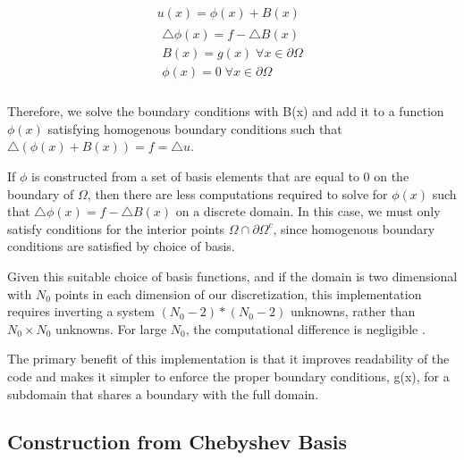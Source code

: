\documentclass[final]{siamart1116}
\numberwithin{theorem}{section}
\begin{document}
\begin{gather}
u(x) = \phi(x) + B(x) \label{boyd} \\
  \begin{split}
  \bigtriangleup \phi(x) = f - \bigtriangleup B(x) \nonumber \\
  B(x) = g(x) \; \forall x \in \partial \Omega \nonumber \\
  \phi(x) = 0 \; \forall x \in \partial \Omega \nonumber \\
  \end{split}
\end{gather}

Therefore, we solve the boundary conditions with B(x) and add it to a function $\phi(x)$ satisfying homogenous boundary conditions such that $ \bigtriangleup (\phi(x) + B(x)) = f = \bigtriangleup u$. 



If $\phi$ is constructed from a set of basis elements that are equal to 0 on the boundary of $\Omega$, then there are less computations required to solve for $\phi(x)$ such that $\bigtriangleup \phi(x) = f - \bigtriangleup B(x)$ on a discrete domain. In this case, we must only satisfy conditions for the interior points $\Omega \cap \partial \Omega^c$, since homogenous boundary conditions are satisfied by choice of basis.


Given this  suitable choice of basis functions, and if the domain is two dimensional with $N_0$ points in each dimension of our discretization, this implementation requires inverting a system $(N_0-2)*(N_0-2)$ unknowns, rather than $N_0 \times N_0 $ unknowns. For large $N_0$, the computational difference is negligible . 

The primary benefit of this implementation is that it improves readability of the code and makes it simpler to enforce the proper boundary conditions, g(x), for a subdomain that shares a boundary with the full domain.



\subsection{Construction from Chebyshev Basis} \label{sec:boydmethod}
\end{document}
